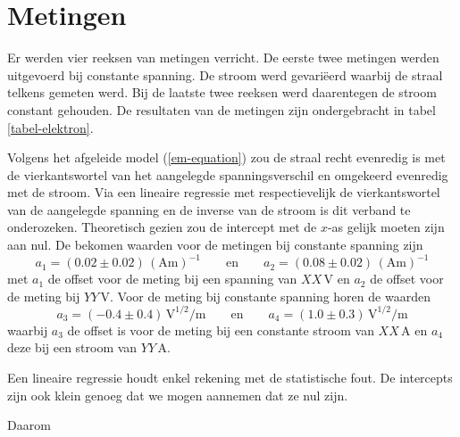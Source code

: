 \section{Metingen}


Er werden vier reeksen van metingen verricht. De eerste twee metingen 
werden uitgevoerd bij constante spanning. De stroom werd gevari\"eerd 
waarbij de straal telkens gemeten werd. Bij de laatste twee reeksen werd 
daarentegen de stroom constant gehouden. De resultaten van de metingen zijn 
ondergebracht in tabel \ref{tabel-elektron}.

Volgens het afgeleide model (\ref{em-equation}) zou de straal recht evenredig 
is met de vierkantswortel van het aangelegde spanningsverschil en omgekeerd 
evenredig met de stroom. Via een lineaire regressie met respectievelijk de 
vierkantswortel van de aangelegde spanning en de inverse van de stroom is 
dit verband te onderozeken. Theoretisch gezien zou de intercept met de 
$x$-as gelijk moeten zijn aan nul.  De bekomen waarden voor de metingen bij 
constante spanning zijn
$$
a_1 = (0.02 \pm 0.02)\,(\textrm{Am})^{-1}
\qquad \textrm{en} \qquad
a_2 = (0.08 \pm 0.02)\,(\textrm{Am})^{-1}
$$
met $a_1$ de offset voor de meting bij een spanning van $XX$\,V en $a_2$ de 
offset voor de meting bij $YY$\,V. Voor de meting bij constante spanning 
horen de waarden
$$
a_3 = (-0.4 \pm 0.4)\,\textrm{V}^{1/2}\textrm{/m}
\qquad \textrm{en} \qquad
a_4 = (1.0 \pm 0.3)\,\textrm{V}^{1/2}\textrm{/m}
$$
waarbij $a_3$ de offset is voor de meting bij een constante stroom van 
$XX$\,A en $a_4$ deze bij een stroom van $YY$\,A.




Een lineaire regressie houdt enkel rekening met de statistische fout. De 
intercepts zijn ook klein genoeg dat we mogen aannemen dat ze nul zijn.

Daarom

